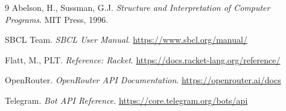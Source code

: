 \documentclass[11pt,a4paper]{article}
\begin{document}
\begin{thebibliography}{9}
  Abelson, H., Sussman, G.J.
  \emph{Structure and Interpretation of Computer Programs}.
  MIT Press, 1996.

  SBCL Team.
  \emph{SBCL User Manual}.
  \url{https://www.sbcl.org/manual/}

  Flatt, M., PLT.
  \emph{Reference: Racket}.
  \url{https://docs.racket-lang.org/reference/}

  OpenRouter.
  \emph{OpenRouter API Documentation}.
  \url{https://openrouter.ai/docs}

  Telegram.
  \emph{Bot API Reference}.
  \url{https://core.telegram.org/bots/api}
\end{thebibliography}
\end{document}
